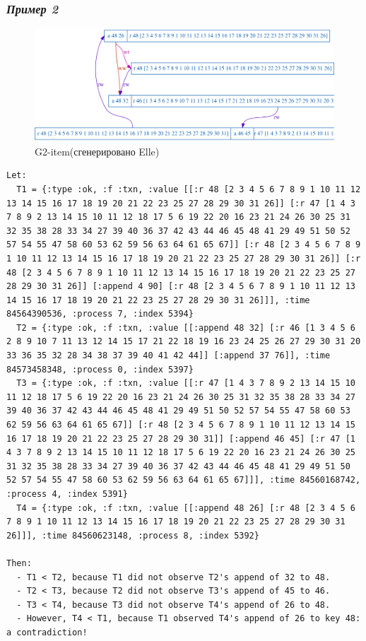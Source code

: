 \documentclass[12pt,  openany]{book}
\begin{document}
\subsubsection{\textit{Пример 2}}
\begin{figure}[H]
  \includegraphics[width=\textwidth]{prefix/7.png}
  \caption{G2-item(сгенерировано Elle)}
\end{figure}
\par
\begin{lstlisting}[caption={Пояснение к G2-item аномалии (сгенерировано Elle)}]
Let:
  T1 = {:type :ok, :f :txn, :value [[:r 48 [2 3 4 5 6 7 8 9 1 10 11 12 13 14 15 16 17 18 19 20 21 22 23 25 27 28 29 30 31 26]] [:r 47 [1 4 3 7 8 9 2 13 14 15 10 11 12 18 17 5 6 19 22 20 16 23 21 24 26 30 25 31 32 35 38 28 33 34 27 39 40 36 37 42 43 44 46 45 48 41 29 49 51 50 52 57 54 55 47 58 60 53 62 59 56 63 64 61 65 67]] [:r 48 [2 3 4 5 6 7 8 9 1 10 11 12 13 14 15 16 17 18 19 20 21 22 23 25 27 28 29 30 31 26]] [:r 48 [2 3 4 5 6 7 8 9 1 10 11 12 13 14 15 16 17 18 19 20 21 22 23 25 27 28 29 30 31 26]] [:append 4 90] [:r 48 [2 3 4 5 6 7 8 9 1 10 11 12 13 14 15 16 17 18 19 20 21 22 23 25 27 28 29 30 31 26]]], :time 84564390536, :process 7, :index 5394}
  T2 = {:type :ok, :f :txn, :value [[:append 48 32] [:r 46 [1 3 4 5 6 2 8 9 10 7 11 13 12 14 15 17 21 22 18 19 16 23 24 25 26 27 29 30 31 20 33 36 35 32 28 34 38 37 39 40 41 42 44]] [:append 37 76]], :time 84573458348, :process 0, :index 5397}
  T3 = {:type :ok, :f :txn, :value [[:r 47 [1 4 3 7 8 9 2 13 14 15 10 11 12 18 17 5 6 19 22 20 16 23 21 24 26 30 25 31 32 35 38 28 33 34 27 39 40 36 37 42 43 44 46 45 48 41 29 49 51 50 52 57 54 55 47 58 60 53 62 59 56 63 64 61 65 67]] [:r 48 [2 3 4 5 6 7 8 9 1 10 11 12 13 14 15 16 17 18 19 20 21 22 23 25 27 28 29 30 31]] [:append 46 45] [:r 47 [1 4 3 7 8 9 2 13 14 15 10 11 12 18 17 5 6 19 22 20 16 23 21 24 26 30 25 31 32 35 38 28 33 34 27 39 40 36 37 42 43 44 46 45 48 41 29 49 51 50 52 57 54 55 47 58 60 53 62 59 56 63 64 61 65 67]]], :time 84560168742, :process 4, :index 5391}
  T4 = {:type :ok, :f :txn, :value [[:append 48 26] [:r 48 [2 3 4 5 6 7 8 9 1 10 11 12 13 14 15 16 17 18 19 20 21 22 23 25 27 28 29 30 31 26]]], :time 84560623148, :process 8, :index 5392}

Then:
  - T1 < T2, because T1 did not observe T2's append of 32 to 48.
  - T2 < T3, because T2 did not observe T3's append of 45 to 46.
  - T3 < T4, because T3 did not observe T4's append of 26 to 48.
  - However, T4 < T1, because T1 observed T4's append of 26 to key 48: a contradiction!
\end{lstlisting}
\end{document}
